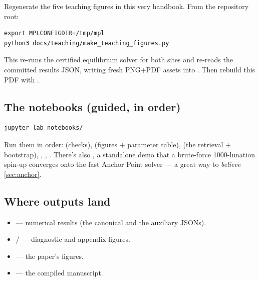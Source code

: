 \begin{tryit}
Regenerate the five teaching figures in this very handbook. From the repository
root:
\begin{lstlisting}[style=shellstyle]
export MPLCONFIGDIR=/tmp/mpl
python3 docs/teaching/make_teaching_figures.py
\end{lstlisting}
This re-runs the certified equilibrium solver for both sites and re-reads the
committed results JSON, writing fresh PNG$+$PDF assets into
. Then rebuild this PDF with
.
\end{tryit}

\subsection{The notebooks (guided, in order)}

\begin{lstlisting}[style=shellstyle]
jupyter lab notebooks/
\end{lstlisting}

Run them in order:  (checks),  (figures $+$
parameter table),  (the \Kd{} retrieval $+$ bootstrap),
, , . There's also
, a standalone demo that a brute-force
1000-lunation spin-up converges onto the fast Anchor Point solver --- a great way
to \emph{believe} \autoref{sec:anchor}.

\subsection{Where outputs land}

\begin{itemize}[leftmargin=1.4em,itemsep=2pt]
  \item {} --- numerical results (the canonical
     and the auxiliary JSONs).
  \item {} /  --- diagnostic and appendix
    figures.
  \item {} --- the paper's figures.
  \item {} --- the compiled manuscript.
\end{itemize}
